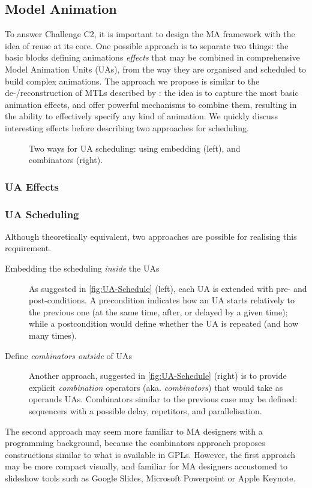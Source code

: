 \subsection{Model Animation}
\label{sec:MA}

To answer Challenge C2, it is important to design the MA framework with
the idea of reuse at its core. One possible approach is to separate two
things: the basic blocks defining animations \emph{effects} that may be combined
in comprehensive Model Animation Units (UAs), from the way they are organised
and scheduled to build complex animations. The approach we propose is similar
to the de-/reconstruction of MTLs described by \citet{J:SyrianiVangheluwe:2013}:
the idea is to capture the most basic animation effects, and offer powerful 
mechanisms to combine them, resulting in the ability to effectively specify any
kind of animation. We quickly discuss interesting effects before describing two
approaches for scheduling.

\begin{figure}[t]%
   \centering
   \caption{Two ways for UA scheduling: using embedding (left), and combinators (right).
   }%
   \label{fig:UA-Schedule}%
\end{figure}

\subsubsection{UA Effects}
\label{sec:MA-Effects}


\subsubsection{UA Scheduling}
\label{sec:MA-Scheduling}

Although theoretically equivalent, two approaches are possible for realising
this requirement.
\begin{description}
   \item[Embedding the scheduling \emph{inside} the UAs] As suggested in 
   \autoref{fig:UA-Schedule} (left), each UA is extended with pre- and 
   post-conditions. A precondition indicates how an UA starts relatively to the 
   previous one (at the same time, after, or delayed by a given time); while a
   postcondition would define whether the UA is repeated (and how many times).
   
   \item[Define \emph{combinators outside} of UAs] Another approach, suggested
   in \autoref{fig:UA-Schedule} (right) is to provide explicit \emph{combination}
   operators (aka. \emph{combinators}) that would take as operands UAs. Combinators
   similar to the previous case may be defined: sequencers with a possible delay,
   repetitors, and parallelisation. 
\end{description}
The second approach may seem more familiar to MA designers with a programming 
background, because the combinators approach proposes constructions similar to
what is available in GPLs. However, the first approach may be more compact visually,
and familiar for MA designers accustomed to slideshow tools such as Google Slides,
Microsoft Powerpoint or Apple Keynote.

